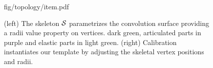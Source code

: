 \begin{figure}[h]
\centering
\begin{overpic} 
[width=\linewidth]
{fig/topology/item.pdf}
\end{overpic}
\caption{
% 
% 
(left) The skeleton $\mathcal{S}$ parametrizes the convolution surface providing a radii value property on vertices. 
% 
 {\color{darkgreen}dark green}, articulated parts in {\color{purple}purple} and elastic parts in {\color{lightgreen}light green}.
% 
(right) Calibration instantiates our template by adjusting the skeletal vertex positions and radii. 
% 
% 
}
\label{fig:topology}
\end{figure}